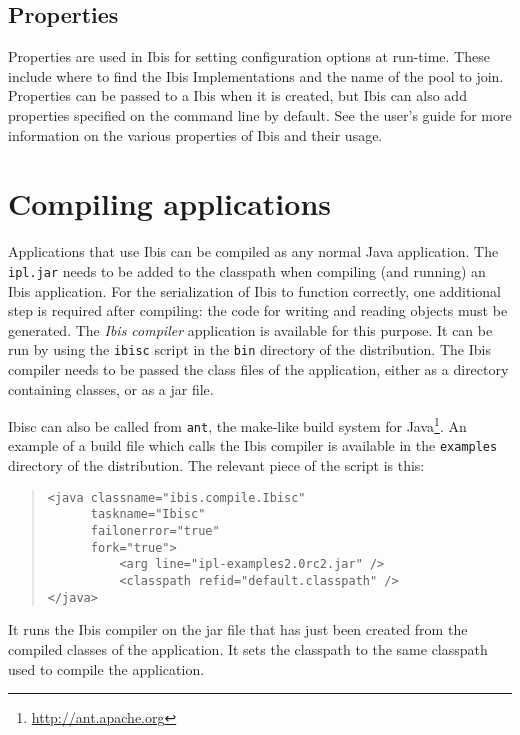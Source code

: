 \documentclass[10pt]{article}
\begin{document}
\subsection{Properties}
\label{properties}

Properties are used in Ibis for setting configuration options at
run-time. These include where to find the Ibis Implementations and the name
of the pool to join. Properties can be passed to a Ibis when it is
created, but Ibis can also add properties specified on the command line
by default. See the user's guide for more information on the various
properties of Ibis and their usage.

\section{Compiling applications}
\label{compiling}


Applications that use Ibis can be compiled as any normal Java
application. The \texttt{ipl.jar} needs to be added to the
classpath when compiling (and running) an Ibis application. For the
serialization of Ibis to function correctly, one additional step is
required after compiling: the code for writing and reading objects must
be generated. The \emph{Ibis compiler} application is available for
this purpose. It can be run by using the \texttt{ibisc}
script in the \texttt{bin} directory of the distribution. The Ibis
compiler needs to be passed the class files of the application, either
as a directory containing classes, or as a jar file.

Ibisc can also be called from \texttt{ant}, the make-like build system
for Java\footnote{\url{http://ant.apache.org}}. An example of a build
file which calls the Ibis compiler is available in the \texttt{examples}
directory of the distribution. The relevant piece of the script is this:

\begin{quote}
\begin{verbatim}
<java classname="ibis.compile.Ibisc"
      taskname="Ibisc"
      failonerror="true"
      fork="true">
          <arg line="ipl-examples2.0rc2.jar" />
          <classpath refid="default.classpath" />
</java>
\end{verbatim}
\end{quote}

It runs the Ibis compiler on the jar file that has just been created
from the compiled classes of the application. It sets the classpath to
the same classpath used to compile the application.
\end{document}
